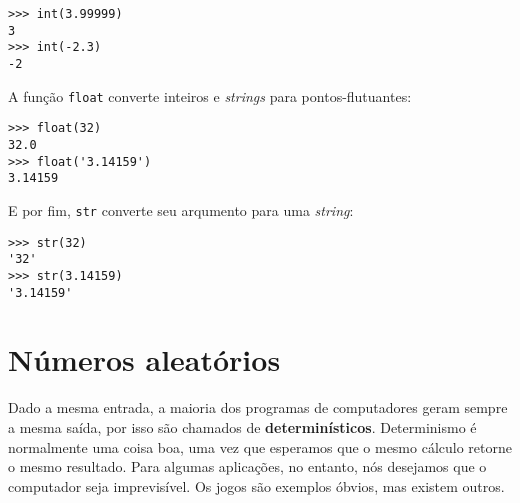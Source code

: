 \beforeverb
\begin{verbatim}
>>> int(3.99999)
3
>>> int(-2.3)
-2
\end{verbatim}
\afterverb
%
%
A função {\tt float} converte inteiros e {\it strings} para pontos-flutuantes:


\beforeverb
\begin{verbatim}
>>> float(32)
32.0
>>> float('3.14159')
3.14159
\end{verbatim}
\afterverb
%
%
E por fim, {\tt str} converte seu arqumento para uma {\it string}:


\beforeverb
\begin{verbatim}
>>> str(32)
'32'
>>> str(3.14159)
'3.14159'
\end{verbatim}
\afterverb
%

\section{Números aleatórios}



Dado a mesma entrada, a maioria dos programas de computadores geram sempre a
mesma saída, por isso são chamados de {\bf determinísticos}. Determinismo é
normalmente uma coisa boa, uma vez que esperamos que o mesmo cálculo retorne
o mesmo resultado. Para algumas aplicações, no entanto, nós desejamos que o
computador seja imprevisível. Os jogos são exemplos óbvios, mas existem outros.



